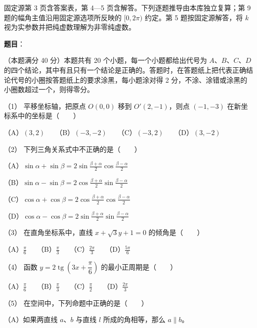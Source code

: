 

\begin{gktip}
固定源第 3 页含答案表，第 4—5 页含解答。下列逐题推导由本库独立复算；第 9 题的幅角主值沿用固定源选项所反映的 $[0,2\pi)$ 约定。第 5 题按固定源解答，将 $k$ 视为实参数并把纯虚数理解为非零纯虚数。
\end{gktip}

\begin{answer}

\textbf{题目}：

（本题满分 40 分）本题共有 20 个小题，每一个小题都给出代号为 $A\text{、}B\text{、}C\text{、}D$ 的四个结论，其中有且只有一个结论是正确的。答题时，在答题纸上把代表正确结论代号的小圈按答题纸上的要求涂黑，每小题涂对得 2 分，不涂、涂错或涂黑的小圈数超过一个，则得零分。

（1） 平移坐标轴，把原点 $O(0,0)$ 移到 $O'(2,-1)$，则点 $(-1,-3)$ 在新坐标系中的坐标是\mbox{（　　）}

（A）$(3,2)$　　（B）$(-3,-2)$　　（C）$(-3,2)$　　（D）$(3,-2)$

（2） 下列三角关系式中不正确的是\mbox{（　　）}

（A）$\sin\alpha+\sin\beta=2\sin\frac{\beta+\alpha}{2}\cos\frac{\beta-\alpha}{2}$

（B）$\sin\alpha-\sin\beta=2\cos\frac{\beta+\alpha}{2}\sin\frac{\beta-\alpha}{2}$

（C）$\cos\alpha+\cos\beta=2\cos\frac{\beta+\alpha}{2}\cos\frac{\beta-\alpha}{2}$

（D）$\cos\alpha-\cos\beta=2\sin\frac{\beta+\alpha}{2}\sin\frac{\beta-\alpha}{2}$

（3） 在直角坐标系中，直线 $x+\sqrt3y+1=0$ 的倾角是\mbox{（　　）}

（A）$\frac\pi6$　　（B）$\frac\pi3$　　（C）$\frac{2\pi}3$　　（D）$\frac{5\pi}6$

（4） 函数 $y=2\operatorname{tg}\left(3x+\dfrac\pi6\right)$ 的最小正周期是\mbox{（　　）}

（A）$\frac\pi6$　　（B）$\frac\pi3$　　（C）$\frac\pi2$　　（D）$\frac{2\pi}3$

（5） 在空间中，下列命题中正确的是\mbox{（　　）}

（A）如果两直线 $a\text{、}b$ 与直线 $l$ 所成的角相等，那么 $a\parallel b$。


\end{answer}
